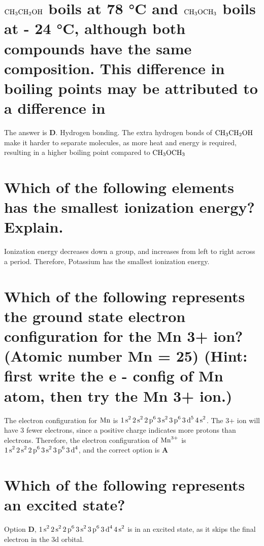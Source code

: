 \documentclass[11pt]{article}
\begin{document}
\section{\(\ce{CH3CH2OH}\) boils at 78 °C and \(\ce{CH3OCH3}\) boils at - 24 °C, although both compounds have the same composition. This difference in boiling points may be attributed to a difference in}
\label{sec:org6622663}
The answer is \textbf{D}. Hydrogen bonding. The extra hydrogen bonds of \(\ce{CH3CH2OH}\) make it harder to separate molecules, as more heat and energy is required, resulting in a higher boiling point compared to \(\ce{CH3OCH3}\)

\section{Which of the following elements has the smallest ionization energy? Explain.}
\label{sec:org0c2b213}
Ionization energy decreases down a group, and increases from left to right across a period. Therefore, Potassium has the smallest ionization energy.

\section{Which of the following represents the ground state electron configuration for the Mn 3+ ion? (Atomic number Mn = 25) (Hint: first write the e - config of Mn atom, then try the Mn 3+ ion.)}
\label{sec:org701015a}
The electron configuration for \(\ce{Mn}\) is \(\ce{1s^2 2s^2 2p^6 3s^2 3p^6 3d^5 4s^2}\). The 3+ ion will have 3 fewer electrons, since a positive charge indicates more protons than electrons. Therefore, the electron configuration of \(\ce{Mn^{3+}}\) is \(\ce{1s^2 2s^2 2p^6 3s^2 3p^6 3d^4}\), and the correct option is \textbf{A}

\section{Which of the following represents an excited state?}
\label{sec:org125eb7f}
Option \textbf{D}, \(\ce{1s^2 2s^2 2p^6 3s^2 3p^6 3d^4 4s^2}\) is in an excited state, as it skips the final electron in the 3d orbital.
\end{document}
